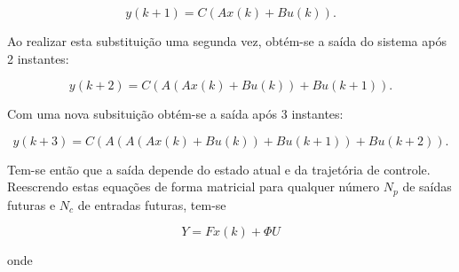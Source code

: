 \begin{equation}
	\label{eq:first-output}
	y(k+1) = C ( A x(k) + B u(k) ).
\end{equation}

Ao realizar esta substituição uma segunda vez, obtém-se a saída do sistema após
2 instantes:

\begin{equation}
	\label{eq:second-output}
	y(k+2) = C ( A ( A x(k) + B u(k) ) + B u(k+1) ).
\end{equation}

Com uma nova subsituição obtém-se a saída após 3 instantes:

\begin{equation}
	\label{eq:third-output}
	y(k+3) = C ( A ( A ( A x(k) + B u(k) ) + B u(k+1) ) + B u(k+2) ).
\end{equation}

Tem-se então que a saída depende do estado atual e da trajetória de controle.
Reescrendo estas equações de forma matricial para qualquer número \( N_p \) de
saídas futuras e \( N_c\) de entradas futuras, tem-se

\begin{equation}
	\label{eq:Y}
	Y = F x(k) + \Phi U
\end{equation}

onde

